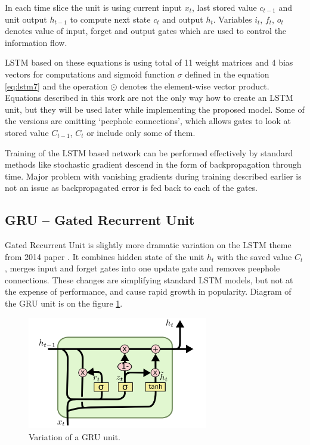 In each time slice the unit is using current input $ x_t $, last stored value $ c_{t-1} $ and unit output $ h_{t-1} $ to compute next state $ c_t $ and output $ h_t $. Variables $ i_t $, $ f_t $, $ o_t $ denotes value of input, forget and output gates which are used to control the information flow.

LSTM based on these equations is using total of 11 weight matrices and 4 bias vectors for computations and sigmoid function $ \sigma $ defined in the equation \eqref{eq:lstm7} and the operation $ \odot $ denotes the element-wise vector product. Equations described in this work are not the only way how to create an LSTM unit, but they will be used later while implementing the proposed model. Some of the versions are omitting \textquoteleft peephole connections\textquoteright, which allows gates to look at stored value $ C_{t-1} $, $ C_t $ or include only some of them.

Training of the LSTM based network can be performed effectively by standard methods like stochastic gradient descend in the form of backpropagation through time. Major problem with vanishing gradients during training described earlier is not an issue as backpropagated error is fed back to each of the gates.


		\subsection{GRU -- Gated Recurrent Unit}\label{subsec:gru}
Gated Recurrent Unit is slightly more dramatic variation on the LSTM theme from 2014 paper \cite{DBLP:journals/corr/ChoMGBSB14}. It combines hidden state of the unit $ h_t $ with the saved value $ C_t $, merges input and forget gates into one update gate and removes peephole connections. These changes are simplifying standard LSTM models, but not at the expense of performance, and cause rapid growth in popularity. Diagram of the GRU unit is on the figure \ref{fig:gru}.

\begin{figure}[!ht]
	\centering
	\includegraphics[width=0.7\textwidth]{./fig/LSTM3-var-GRU.png}
	\caption{Variation of a GRU unit. \cite{colah-lstm}
		\label{fig:gru}}
\end{figure}

